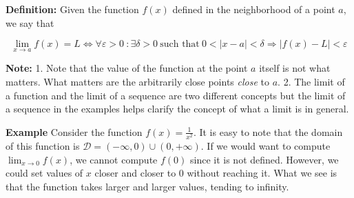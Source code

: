 \documentclass[11pt]{article}
\begin{document}
\textbf{Definition:} Given the function \(f(x)\) defined in the
neighborhood of a point \(a\), we say that

\[
\lim_{x\rightarrow a} f(x) = L \iff \forall\varepsilon > 0 \ : \exists \delta > 0 \ \text{such that} \ 0<\lvert x-a\rvert < \delta \Rightarrow \lvert f(x) - L \rvert < \varepsilon
\]

\textbf{Note:} 1. Note that the value of the function at the point \(a\)
itself is not what matters. What matters are the arbitrarily close
points \emph{close} to \(a\). 2. The limit of a function and the limit
of a sequence are two different concepts but the limit of a sequence in
the examples helps clarify the concept of what a limit is in general.

\textbf{Example} Consider the function \(f(x) = \frac{1}{x^2}\). It is
easy to note that the domain of this function is
\(\mathcal{D} = (-\infty,0)\cup(0,+\infty)\). If we would want to
compute \(\lim_{x\rightarrow 0}f(x)\), we cannot compute \(f(0)\) since
it is not defined. However, we could set values of \(x\) closer and
closer to \(0\) without reaching it. What we see is that the function
takes larger and larger values, tending to infinity.
\end{document}
